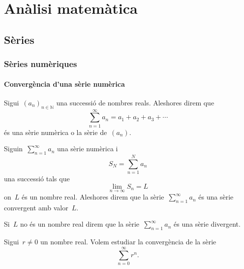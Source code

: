 \documentclass[../../main.tex]{subfiles}
\begin{document}
\part{Anàlisi matemàtica}
\chapter{Sèries}
\section{Sèries numèriques}
    \subsection{Convergència d'una sèrie numèrica}
    \begin{definition}
        \label{def:sèrie numèrica}
        Sigui~\((a_{n})_{n\in\mathbb{N}}\) una successió de nombres reals.
        Aleshores direm que
        \[
            \sum_{n=1}^{\infty}a_{n}=a_{1}+a_{2}+a_{3}+\cdots
        \]
        és una sèrie numèrica o la sèrie de~\((a_{n})\).
    \end{definition}
    \begin{definition}
        \label{def:sèrie convergent}
        \label{def:sèrie divergent}
        Siguin~\(\sum_{n=1}^{\infty}a_{n}\) una sèrie numèrica i
        \[
            S_{N}=\sum_{n=1}^{N}a_{n}
        \]
        una successió tals que
        \[
            \lim_{n\to\infty}S_{n}=L
        \]
        on~\(L\) és un nombre real.
        Aleshores direm que la sèrie~\(\sum_{n=1}^{\infty}a_{n}\) és una sèrie convergent amb valor~\(L\).

        Si~\(L\) no és un nombre real direm que la sèrie~\(\sum_{n=1}^{\infty}a_{n}\) és una sèrie divergent.
    \end{definition}
    \begin{example}
        \label{ex:sèries geomètriques}
        Sigui~\(r\neq0\) un nombre real.
        Volem estudiar la convergència de la sèrie
        \begin{equation}
            \label{ex:sèries geomètriques:eq1}
            \sum_{n=0}^{\infty}r^{n}.
        \end{equation}
    \end{example}
\end{document}
